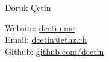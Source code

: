 \documentclass[main.tex]{subfiles}
\begin{document}

\begin{minipage}[t]{0.60\textwidth}
 \selectfont
\vspace*{\fill}
\Huge Doruk Çetin
\end{minipage}
\begin{minipage}[t]{0.35\textwidth}
\begin{flushright}
Website: \href{http://dcetin.me/}{dcetin.me} \\ 
Email: \href{mailto:dcetin@ethz.ch}{dcetin@ethz.ch} \\
Github: \href{https://github.com/dcetin/}{github.com/dcetin}
\end{flushright}
\end{minipage}
\end{document}

